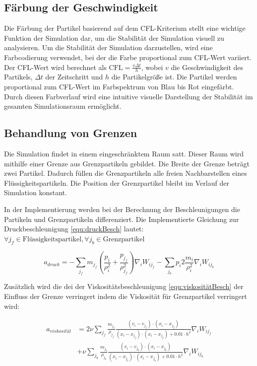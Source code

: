 \documentclass[a4paper, 12pt]{article}
\begin{document}
\subsection{Färbung der Geschwindigkeit}
Die Färbung der Partikel basierend auf dem CFL-Kriterium stellt eine wichtige Funktion der Simulation dar, um die Stabilität der Simulation visuell zu analysieren. Um die Stabilität der Simulation darzustellen, wird eine Farbcodierung verwendet, bei der die Farbe proportional zum CFL-Wert variiert.
Der CFL-Wert wird berechnet als $\text{CFL} = \frac{v \Delta t}{h}$, wobei \(v\) die Geschwindigkeit des Partikels, \(\Delta t\) der Zeitschritt und \(h\) die Partikelgröße ist.
Die Partikel werden proportional zum CFL-Wert im Farbspektrum von Blau bis Rot eingefärbt. Durch diesen Farbverlauf wird eine intuitive visuelle Darstellung der Stabilität im gesamten Simulationsraum ermöglicht.
 
\subsection{Behandlung von Grenzen}
Die Simulation findet in einem eingeschränktem Raum satt. Dieser Raum wird mithilfe einer Grenze aus Grenzpartikeln gebildet. Die Breite der Grenze beträgt zwei Partikel. Dadurch füllen die Grenzpartikeln alle freien Nachbarstellen eines Flüssigkeitspartikeln. Die Position der  Grenzpartikel bleibt im Verlauf der Simulation konstant. 

In der Implementierung werden bei der Berechnung der Beschleunigungen die Partikeln und Grenzpartikeln differenziert. Die Implementierte Gleichung zur Druckbeschleunigung \eqref{equ:druckBesch} lautet: $\forall j_f \in \text{Flüssigkeitspartikel}, \forall j_b \in \text{Grenzpartikel}$ 

\begin{equation} \label{equ:druckBeschGrenze}
	a_{druck} = -\sum_{j_f} m_{j_f} \left( \frac{p_i}{\rho_i^2} + \frac{p_{j_f}}{\rho_{j_f}^2} \right) \nabla_i W_{i{j_f}} -\sum_{j_b} p_i 2\frac{m_i}{\rho_i^2} \nabla_i W_{i{j_b}}
\end{equation}

Zusätzlich wird die dei der Viskositätsbeschleunigung \eqref{equ:viskositätBesch} der Einfluss der Grenze verringert indem die Viskosität für Grenzpartikel verringert wird:

\begin{align}
	a_{viskosität} &= 2 \nu \sum_{j_f} \frac{m_{j_f}}{\rho_{j_f}} \frac{(v_i - v_{j_f}) \cdot (x_i - x_{j_f})}{(x_i - x_{j_f}) \cdot (x_i - x_{j_f}) + 0.01\cdot h^2} \nabla_i W_{i{j_f}} \nonumber \\
	&+ \nu \sum_{j_b} \frac{m_{j_b}}{\rho_{j_b}} \frac{(v_i - v_{j_b}) \cdot (x_i - x_{j_b})}{(x_i - x_{j_b}) \cdot (x_i - x_{j_b}) + 0.01\cdot h^2} \nabla_i W_{i{j_b}} \label{equ:viskositätBeschGrenze}
\end{align}
\end{document}
